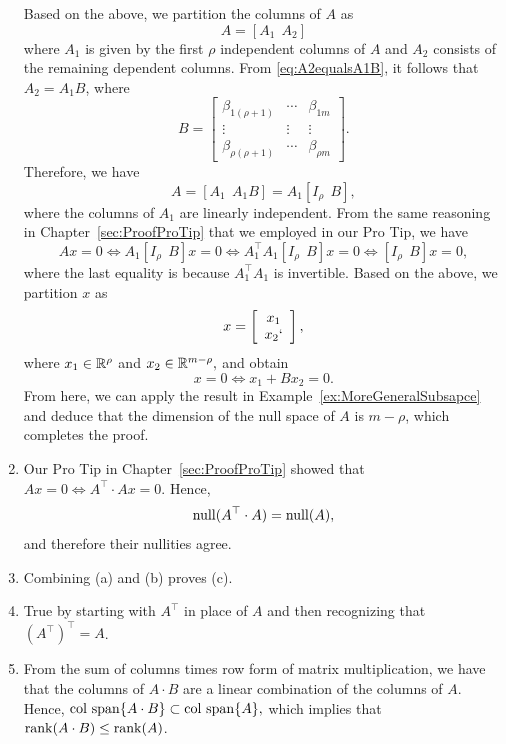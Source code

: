 \begin{enumerate}
Based on the above, we partition the columns of $A$ as 
$$A = \left[A_1~~A_2 \right] $$
where $A_1$ is given by the first $\rho$ independent columns of $A$ and $A_2$ consists of the remaining dependent columns. From \eqref{eq:A2equalsA1B}, it follows that $A_2 = A_1 B$, where 
$$B=  \left[ \begin{array}{ccc}
\beta_{1(\rho +1)}  & \cdots & \beta_{1 m} \\
\vdots & \vdots & \vdots \\
\beta_{\rho(\rho+ 1)} & \cdots & \beta_{\rho m}
  \end{array} \right].$$
 Therefore, we have
 \begin{equation}
    \label{eq:A2equalsA1B_02}
    A=\left[ A_1~~A_1 B\right] = A_1 \left[ I_\rho~~ B\right],
\end{equation}
where the columns of $A_1$ are linearly independent. From the same reasoning in Chapter~\ref{sec:ProofProTip} that we employed in our Pro Tip, we have 
$$Ax = 0 \iff  A_1 \left[ I_\rho~~ B\right] x = 0 \iff A_1^\top A_1 \left[ I_\rho~~ B\right] x =0 \iff \left[ I_\rho~~ B\right] x =0,$$
where the last equality is because $A_1^\top A_1$ is invertible. 
Based on the above, we partition $x$ as 
$$
x=\left[ \begin{array}{c}
x_1 \\ x_2`
  \end{array} \right],
  $$
  where $x_1 \in \mathbb R^\rho$ and $x_2 \in \mathbb R ^{m-\rho},$
  and obtain
  $$x=0 \iff x_1 +B x_2 =0. $$
  From here, we can apply the result in Example~\ref{ex:MoreGeneralSubsapce} and deduce that the dimension of the null space of $A$ is $m-\rho$, which completes the proof. 
  
  \item Our Pro Tip in Chapter~\ref{sec:ProofProTip} showed that $Ax=0 \iff A^\top \cdot A x = 0$. Hence, 
  $$ \mathrm{null}(A^\top \cdot A) = \mathrm{null}(A), $$
  and therefore their nullities agree.
  
  \item Combining (a) and (b) proves (c).
  
  \item True by starting with $A^\top$ in place of $A$ and then recognizing that $\left( A^\top \right)^\top = A$.
  
  \item From the sum of columns times row form of matrix multiplication, we have that the columns of $A \cdot B$ are a linear combination of the columns of $A$. Hence, $\mathrm{col~span} \{ A \cdot B \} \subset \mathrm{col~span} \{ A \},$ which implies that $\mathrm{rank}(A \cdot B) \le  \mathrm{rank}(A)$.
  

\end{enumerate}
